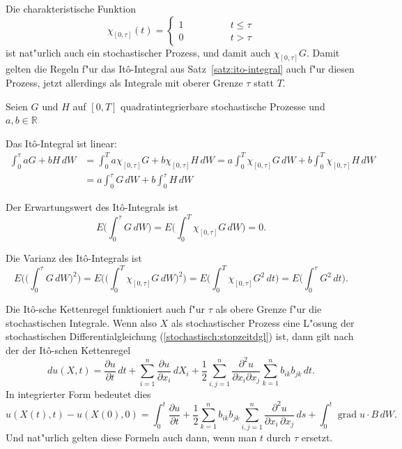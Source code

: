 Die charakteristische Funktion
\[
\chi_{[0,\tau]}(t)=\begin{cases}
1\qquad\qquad&t\le \tau\\
0            &t>\tau
\end{cases}
\]
ist nat"urlich auch ein stochastischer Prozess, und damit auch 
$\chi_{[0,\tau]}G$.
Damit gelten die Regeln f"ur das It\^o-Integral aus
Satz~\ref{satz:ito-integral} auch f"ur diesen Prozess, jetzt allerdings
als Integrale mit oberer Grenze $\tau$ statt $T$.

\begin{hilfssatz}
Seien $G$ und $H$ auf $[0,T]$ quadratintegrierbare stochastische Prozesse
und $a,b\in\mathbb R$
\begin{compactenum}
\item
Das It\^o-Integral ist linear:
\begin{align*}
\int_0^\tau aG+bH\,dW
&=
\int_0^T a\chi_{[0,\tau]} G + b \chi_{[0,\tau]} H\,dW
=
a\int_0^T \chi_{[0,\tau]} G\,dW + b \int_0^T\chi_{[0,\tau]} H\,dW
\\
&=
a\int_0^\tau G\,dW + b \int_0^\tau H\,dW
\end{align*}
\item Der Erwartungswert des It\^o-Integrals ist
\[
E\biggl(\int_0^\tau G\,dW\biggr)
=
E\biggl(\int_0^T \chi_{[0,\tau]}G\,dW\biggr)
=
0.
\]
\item Die Varianz des It\^o-Integrals ist
\[
E\biggl(\biggl(\int_0^\tau G\,dW\biggr)^2\biggr)
=
E\biggl(\biggl(\int_0^T \chi_{[0,\tau]}G\,dW\biggr)^2\biggr)
=
E\biggl(\int_0^T\chi_{[0,\tau]}G^2\,dt\biggr)
=
E\biggl(\int_0^\tau G^2\,dt\biggr).
\]
\end{compactenum}
\end{hilfssatz}

Die It\^o-sche Kettenregel funktioniert auch f"ur $\tau$ als obere
Grenze f"ur die stochastischen Integrale.
Wenn also $X$ als stochastischer Prozess eine L"osung der stochastischen
Differentialgleichung (\ref{stochastisch:stopzeitdgl}) ist, dann gilt
nach der der It\^o-schen Kettenregel
\[
du(X,t)
=
\frac{\partial u}{\partial t}\,dt
+
\sum_{i=1}^n\frac{\partial u}{\partial x_i}\,dX_i
+
\frac12\sum_{i,j=1}^n\frac{\partial^2 u}{\partial x_i\partial x_j}
\sum_{k=1}^n b_{ik}b_{jk}\,dt.
\]
In integrierter Form bedeutet dies
\[
u(X(t),t)-u(X(0),0)
=
\int_0^t
\frac{\partial u}{\partial t}
+
\frac12\sum_{k=1}^nb_{ik}b_{jk}
\sum_{i,j=1}^n \frac{\partial^2u}{\partial x_i\,\partial x_j} \,ds
+
\int_0^t \operatorname{grad} u\cdot B\,dW.
\]
Und nat"urlich gelten diese Formeln auch dann, wenn man $t$ durch $\tau$
ersetzt.

